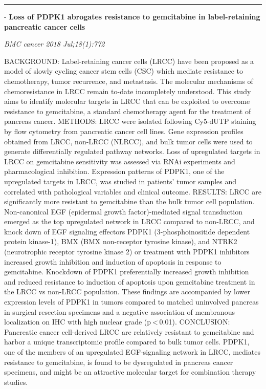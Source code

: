 \documentclass[]{article}
\begin{document}
{}

\begin{center}\rule{0.5\linewidth}{\linethickness}\end{center}

 - \textbf{Loss of PDPK1 abrogates resistance to gemcitabine in
label-retaining pancreatic cancer cells}

\emph{BMC cancer 2018 Jul;18(1):772}

BACKGROUND: Label-retaining cancer cells (LRCC) have been proposed as a
model of slowly cycling cancer stem cells (CSC) which mediate resistance
to chemotherapy, tumor recurrence, and metastasis. The molecular
mechanisms of chemoresistance in LRCC remain to-date incompletely
understood. This study aims to identify molecular targets in LRCC that
can be exploited to overcome resistance to gemcitabine, a standard
chemotherapy agent for the treatment of pancreas cancer. METHODS: LRCC
were isolated following Cy5-dUTP staining by flow cytometry from
pancreatic cancer cell lines. Gene expression profiles obtained from
LRCC, non-LRCC (NLRCC), and bulk tumor cells were used to generate
differentially regulated pathway networks. Loss of upregulated targets
in LRCC on gemcitabine sensitivity was assessed via RNAi experiments and
pharmacological inhibition. Expression patterns of PDPK1, one of the
upregulated targets in LRCC, was studied in patients' tumor samples and
correlated with pathological variables and clinical outcome. RESULTS:
LRCC are significantly more resistant to gemcitabine than the bulk tumor
cell population. Non-canonical EGF (epidermal growth factor)-mediated
signal transduction emerged as the top upregulated network in LRCC
compared to non-LRCC, and knock down of EGF signaling effectors PDPK1
(3-phosphoinositide dependent protein kinase-1), BMX (BMX non-receptor
tyrosine kinase), and NTRK2 (neurotrophic receptor tyrosine kinase 2) or
treatment with PDPK1 inhibitors increased growth inhibition and
induction of apoptosis in response to gemcitabine. Knockdown of PDPK1
preferentially increased growth inhibition and reduced resistance to
induction of apoptosis upon gemcitabine treatment in the LRCC vs
non-LRCC population. These findings are accompanied by lower expression
levels of PDPK1 in tumors compared to matched uninvolved pancreas in
surgical resection specimens and a negative association of membranous
localization on IHC with high nuclear grade (p \textless{} 0.01).
CONCLUSION: Pancreatic cancer cell-derived LRCC are relatively resistant
to gemcitabine and harbor a unique transcriptomic profile compared to
bulk tumor cells. PDPK1, one of the members of an upregulated
EGF-signaling network in LRCC, mediates resistance to gemcitabine, is
found to be dysregulated in pancreas cancer specimens, and might be an
attractive molecular target for combination therapy studies.
\end{document}
